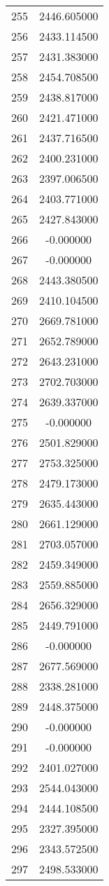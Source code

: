 \documentclass[12pt]{article}
\begin{document}
\begin{longtable}{@{}cc@{}}
255 & 2446.605000 \\
256 & 2433.114500 \\
257 & 2431.383000 \\
258 & 2454.708500 \\
259 & 2438.817000 \\
260 & 2421.471000 \\
261 & 2437.716500 \\
262 & 2400.231000 \\
263 & 2397.006500 \\
264 & 2403.771000 \\
265 & 2427.843000 \\
266 & -0.000000 \\
267 & -0.000000 \\
268 & 2443.380500 \\
269 & 2410.104500 \\
270 & 2669.781000 \\
271 & 2652.789000 \\
272 & 2643.231000 \\
273 & 2702.703000 \\
274 & 2639.337000 \\
275 & -0.000000 \\
276 & 2501.829000 \\
277 & 2753.325000 \\
278 & 2479.173000 \\
279 & 2635.443000 \\
280 & 2661.129000 \\
281 & 2703.057000 \\
282 & 2459.349000 \\
283 & 2559.885000 \\
284 & 2656.329000 \\
285 & 2449.791000 \\
286 & -0.000000 \\
287 & 2677.569000 \\
288 & 2338.281000 \\
289 & 2448.375000 \\
290 & -0.000000 \\
291 & -0.000000 \\
292 & 2401.027000 \\
293 & 2544.043000 \\
294 & 2444.108500 \\
295 & 2327.395000 \\
296 & 2343.572500 \\
297 & 2498.533000 \\

\end{longtable}
\end{document}

